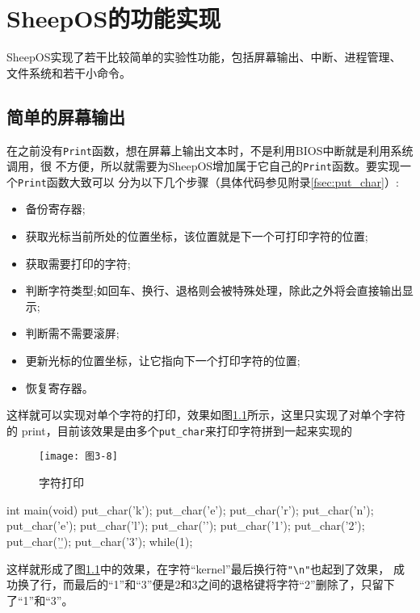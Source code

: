 \chapter{SheepOS的功能实现}

SheepOS实现了若干比较简单的实验性功能，包括屏幕输出、中断、进程管理、
文件系统和若干小命令。

\section{简单的屏幕输出}

在之前没有\texttt{Print}函数，想在屏幕上输出文本时，不是利用BIOS中断就是利用系统调用，很
不方便，所以就需要为SheepOS增加属于它自己的\texttt{Print}函数。要实现一个\texttt{Print}函数大致可以
分为以下几个步骤（具体代码参见附录\ref{fsec:put_char}）:

\begin{itemize}
\item 备份寄存器;
\item 获取光标当前所处的位置坐标，该位置就是下一个可打印字符的位置;
\item 获取需要打印的字符;
\item 判断字符类型;如回车、换行、退格则会被特殊处理，除此之外将会直接输出显示;
\item 判断需不需要滚屏;
\item 更新光标的位置坐标，让它指向下一个打印字符的位置;
\item 恢复寄存器。
\end{itemize}
这样就可以实现对单个字符的打印，效果如图\ref{fig:print_char}所示，这里只实现了对单个字符的
print，目前该效果是由多个\texttt{put\_char}来打印字符拼到一起来实现的

\begin{figure}[H]
  \centering
  \texttt{[image: 图3-8]}
  \caption{字符打印}
  \label{fig:print_char}
\end{figure}

\begin{codeblock}
\begin{ccode}
int main(void)
{
    put_char('k');
    put_char('e');
    put_char('r');
    put_char('n');
    put_char('e');
    put_char('l');
    put_char('\n');
    put_char('1');
    put_char('2');
    put_char('\b');
    put_char('3');
    while(1);
}
\end{ccode}
\end{codeblock}

这样就形成了图\ref{fig:print_char}中的效果，在字符“kernel”最后换行符\verb|"\n"|也起到了效果，
成功换了行，而最后的“1”和“3”便是2和3之间的退格键将字符“2”删除了，只留下了“1”和“3”。

